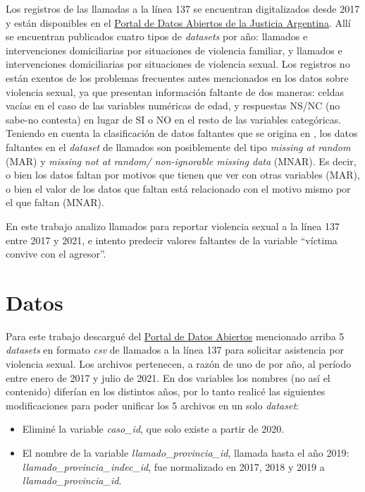 \documentclass[10 pt]{article}
\begin{document}
Los registros de las llamadas a la línea 137 se encuentran digitalizados desde 2017 y están disponibles en el \href{http://datos.jus.gob.ar/}{Portal de Datos Abiertos de la Justicia Argentina}. Allí se encuentran publicados cuatro tipos de \textit{datasets} por año: llamados e intervenciones domiciliarias por situaciones de violencia familiar, y llamados e intervenciones domiciliarias por situaciones de violencia sexual.
Los registros no están exentos de los problemas frecuentes antes mencionados en los datos sobre violencia sexual, ya que presentan información faltante de dos maneras: celdas vacías en el caso de las variables numéricas de edad, y respuestas NS/NC (no sabe-no contesta) en lugar de SI o NO en el resto de las variables categóricas. Teniendo en cuenta la clasificación de datos faltantes que se origina en \citet{rubin1976inference}, los datos faltantes en el \textit{dataset} de llamados son posiblemente del tipo \textit{missing at random} (MAR) y \textit{missing not at random/ non-ignorable missing data} (MNAR). Es decir, o bien los datos faltan por motivos que tienen que ver con otras variables (MAR), o bien el valor de los datos que faltan está relacionado con el motivo mismo por el que faltan (MNAR).

En este trabajo analizo llamados para reportar violencia sexual a la línea 137 entre 2017 y 2021, e intento predecir valores faltantes de la variable “víctima convive con el agresor”. 



\section*{Datos}\label{datos}

Para este trabajo descargué del \href{http://datos.jus.gob.ar/}{Portal de Datos Abiertos} mencionado arriba 5 \textit{datasets} en formato \textit{csv} de llamados a la línea 137 para solicitar asistencia por violencia sexual. Los archivos pertenecen, a razón de uno de por año, al período entre enero de 2017 y julio de 2021. 
En dos variables los nombres (no así el contenido) diferían en los distintos años, por lo tanto realicé las siguientes modificaciones para poder unificar los 5 archivos en un solo \textit{dataset}: 

\begin{itemize}
    \item Eliminé la variable \textit{caso\_id}, que solo existe a partir de 2020.
    \item El nombre de la variable \textit{llamado\_provincia\_id}, llamada hasta el año 2019: \textit{llamado\_provincia\_indec\_id}, fue normalizado en 2017, 2018 y 2019 a \textit{llamado\_provincia\_id}.
\end{itemize}
\end{document}
